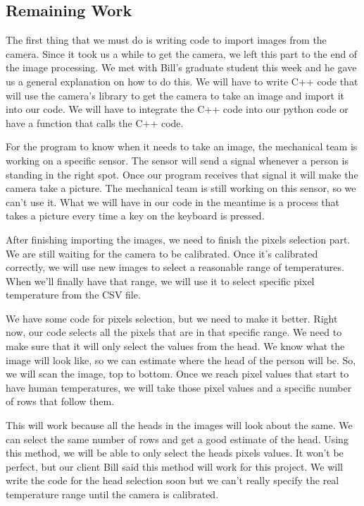 \documentclass[onecolumn, draftclsnofoot,10pt, compsoc]{IEEEtran}
\begin{document}
\subsection{Remaining Work}

The first thing that we must do is writing code to import images from the camera. Since it took us a while to get the camera, we left this part to the end of the image processing. We met with Bill’s graduate student this week and he gave us a general explanation on how to do this. We will have to write C++ code that will use the camera’s library to get the camera to take an image and import it into our code. We will have to integrate the C++ code into our python code or have a function that calls the C++ code. 

For the program to know when it needs to take an image, the mechanical team is working on a specific sensor. The sensor will send a signal whenever a person is standing in the right spot. Once our program receives that signal it will make the camera take a picture. The mechanical team is still working on this sensor, so we can’t use it. What we will have in our code in the meantime is a process that takes a picture every time a key on the keyboard is pressed. 

After finishing importing the images, we need to finish the pixels selection part. We are still waiting for the camera to be calibrated. Once it’s calibrated correctly, we will use new images to select a reasonable range of temperatures. When we’ll finally have that range, we will use it to select specific pixel temperature from the CSV file. 

We have some code for pixels selection, but we need to make it better.  Right now, our code selects all the pixels that are in that specific range. We need to make sure that it will only select the values from the head. We know what the image will look like, so we can estimate where the head of the person will be. So, we will scan the image, top to bottom.  Once we reach pixel values that start to have human temperatures, we will take those pixel values and a specific number of rows that follow them. 

This will work because all the heads in the images will look about the same. We can select the same number of rows and get a good estimate of the head.  Using this method, we will be able to only select the heads pixels values. It won’t be perfect, but our client Bill said this method will work for this project. We will write the code for the head selection soon but we can’t really specify the real temperature range until the camera is calibrated. 
\end{document}
